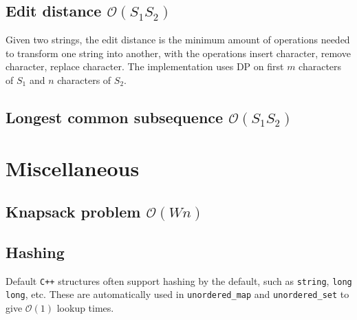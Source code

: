 \subsection{Edit distance $\mathcal O(S_1S_2)$}

Given two strings, the edit distance is the minimum amount of operations needed to transform one string into another, with the operations insert character, remove character, replace character. The implementation uses DP on first $m$ characters of $S_1$ and $n$ characters of $S_2$.







\subsection{Longest common subsequence $\mathcal O(S_1S_2)$}






\section{Miscellaneous}

\subsection{Knapsack problem $\mathcal O(Wn)$}




\subsection{Hashing}

Default \texttt{C++} structures often support hashing by the default, such as \texttt{string}, \texttt{long long}, etc. These are automatically used in \texttt{unordered\_map} and \texttt{unordered\_set} to give $\mathcal O(1)$ lookup times.

